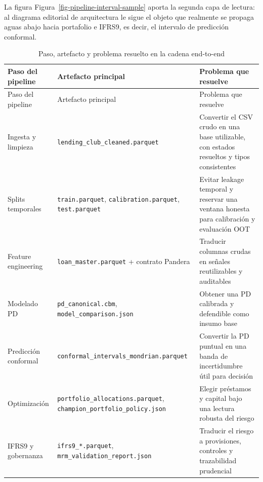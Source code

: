 \documentclass[
  spanish,
  11pt,
  letterpaper,
]{scrbook}
\theoremstyle{plain}
\theoremstyle{remark}
\begin{document}
La figura Figura~\ref{fig-pipeline-interval-sample} aporta la segunda
capa de lectura: al diagrama editorial de arquitectura le sigue el
objeto que realmente se propaga aguas abajo hacia portafolio e IFRS9, es
decir, el intervalo de predicción conformal.

\begin{longtable}[]{@{}
  >{\raggedright\arraybackslash}p{}
  >{\raggedright\arraybackslash}p{}
  >{\raggedright\arraybackslash}p{}@{}}
\caption{Paso, artefacto y problema resuelto en la cadena
end-to-end}\label{tbl-pipeline-step-artifact}\tabularnewline
\toprule\noalign{}
\begin{minipage}[b]{\linewidth}\raggedright
Paso del pipeline
\end{minipage} & \begin{minipage}[b]{\linewidth}\raggedright
Artefacto principal
\end{minipage} & \begin{minipage}[b]{\linewidth}\raggedright
Problema que resuelve
\end{minipage} \\
\midrule\noalign{}
\endfirsthead
\toprule\noalign{}
\begin{minipage}[b]{\linewidth}\raggedright
Paso del pipeline
\end{minipage} & \begin{minipage}[b]{\linewidth}\raggedright
Artefacto principal
\end{minipage} & \begin{minipage}[b]{\linewidth}\raggedright
Problema que resuelve
\end{minipage} \\
\midrule\noalign{}
\endhead
\bottomrule\noalign{}
\endlastfoot
Ingesta y limpieza & \texttt{lending\_club\_cleaned.parquet} & Convertir
el CSV crudo en una base utilizable, con estados resueltos y tipos
consistentes \\
Splits temporales & \texttt{train.parquet},
\texttt{calibration.parquet}, \texttt{test.parquet} & Evitar leakage
temporal y reservar una ventana honesta para calibración y evaluación
OOT \\
Feature engineering & \texttt{loan\_master.parquet} + contrato Pandera &
Traducir columnas crudas en señales reutilizables y auditables \\
Modelado PD & \texttt{pd\_canonical.cbm},
\texttt{model\_comparison.json} & Obtener una PD calibrada y defendible
como insumo base \\
Predicción conformal & \texttt{conformal\_intervals\_mondrian.parquet} &
Convertir la PD puntual en una banda de incertidumbre útil para
decisión \\
Optimización & \texttt{portfolio\_allocations.parquet},
\texttt{champion\_portfolio\_policy.json} & Elegir préstamos y capital
bajo una lectura robusta del riesgo \\
IFRS9 y gobernanza & \texttt{ifrs9\_*.parquet},
\texttt{mrm\_validation\_report.json} & Traducir el riesgo a
provisiones, controles y trazabilidad prudencial \\
\end{longtable}
\end{document}

